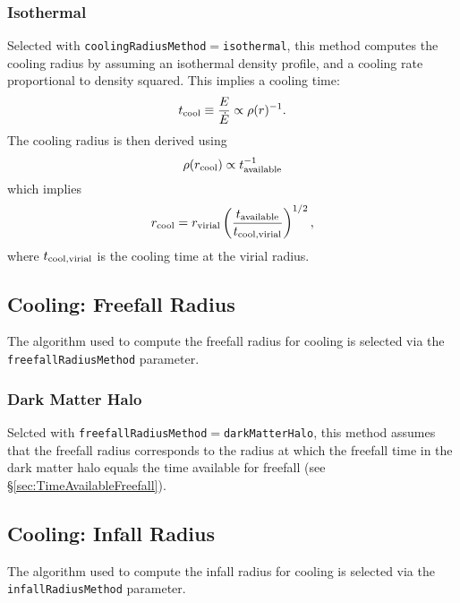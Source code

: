 \subsubsection{Isothermal}

Selected with {\tt coolingRadiusMethod}$=${\tt isothermal}, this method computes the cooling radius by assuming an isothermal density profile, and a cooling rate proportional to density squared. This implies a cooling time:
\begin{equation}
 t_{\rm cool} \equiv {E\over\dot{E}} \propto \rho(r)^{-1}.
\end{equation}
The cooling radius is then derived using
\begin{equation}
 \rho(r_{\rm cool}) \propto t_{\rm available}^{-1}
\end{equation}
which implies
\begin{equation}
 r_{\rm cool} = r_{\rm virial} \left( { t_{\rm available} \over t_{\rm cool,virial}} \right)^{1/2},
\end{equation}
where $t_{\rm cool,virial}$ is the cooling time at the virial radius.

\subsection{Cooling: Freefall Radius}\label{sec:CoolingFreefallRadius}

The algorithm used to compute the freefall radius for cooling is selected via the {\tt freefallRadiusMethod} parameter.

\subsubsection{Dark Matter Halo}

Selcted with {\tt freefallRadiusMethod}$=${\tt darkMatterHalo}, this method assumes that the freefall radius corresponds to the radius at which the freefall time in the dark matter halo equals the time available for freefall (see \S\ref{sec:TimeAvailableFreefall}).

\subsection{Cooling: Infall Radius}\label{sec:CoolingInfallRadius}

The algorithm used to compute the infall radius for cooling is selected via the {\tt infallRadiusMethod} parameter.

